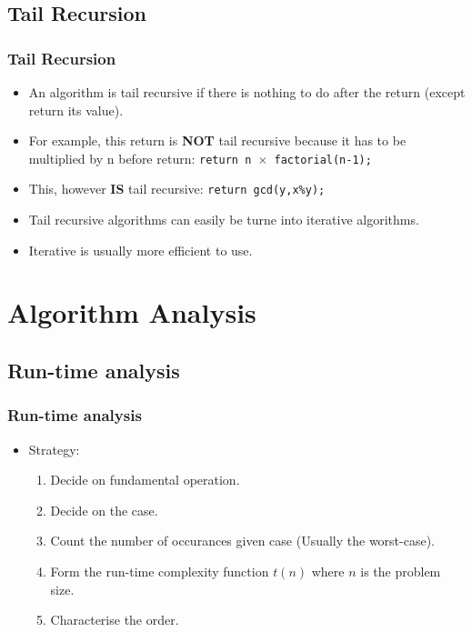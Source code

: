 \documentclass{beamer}
\begin{document}
\subsection{Tail Recursion}
\begin{frame}
\frametitle{Tail Recursion}
\begin{itemize}
\item An algorithm is {\color{green} tail recursive} if there is nothing to do after the return (except return its value).
\item For example, this return is \textbf{NOT} {\color{green} tail recursive} because it has to be multiplied by n before return:
\texttt{return n $\times$ factorial(n-1);}
\item This, however \textbf{IS} {\color{green} tail recursive}: \texttt{return gcd(y,x\%y);}
\item {\color{green} Tail recursive} algorithms can easily be turne into {\color{red} iterative} algorithms.
\item {\color{red} Iterative} is usually more efficient to use.
\end{itemize}
\end{frame}

\section{Algorithm Analysis}
\subsection{Run-time analysis}
\begin{frame}
\frametitle{Run-time analysis}
\begin{itemize}
\item Strategy:
\begin{enumerate}
\item Decide on {\color{green} fundamental operation}.
\item Decide on the {\color{red}case}.
\item Count the {\color{orange} number} of occurances given {\color{red}case} (Usually the {\color{magenta} worst-case}).
\item Form the {\color{purple} run-time complexity function} $t(n)$ where $n$ is the problem size.
\item Characterise the {\color{brown} order}.
\end{enumerate}
\end{itemize}
\end{frame}
\end{document}
